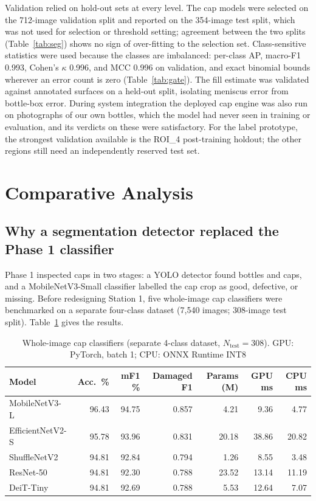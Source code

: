 Validation relied on hold-out sets at every level. The cap models were selected on the 712-image validation split and reported on the 354-image test split, which was not used for selection or threshold setting; agreement between the two splits (Table~\ref{tab:seg}) shows no sign of over-fitting to the selection set. Class-sensitive statistics were used because the classes are imbalanced: per-class AP, macro-F1 0.993, Cohen's $\kappa$ 0.996, and MCC 0.996 on validation, and exact binomial bounds wherever an error count is zero (Table~\ref{tab:gate}). The fill estimate was validated against annotated surfaces on a held-out split, isolating meniscus error from bottle-box error. During system integration the deployed cap engine was also run on photographs of our own bottles, which the model had never seen in training or evaluation, and its verdicts on these were satisfactory. For the label prototype, the strongest validation available is the ROI\_4 post-training holdout; the other regions still need an independently reserved test set.

\section{Comparative Analysis}
\label{sec:comparative-analysis}

\subsection{Why a segmentation detector replaced the Phase 1 classifier}
\label{sec:why-seg}
Phase 1 inspected caps in two stages: a YOLO detector found bottles and caps, and a MobileNetV3-Small classifier labelled the cap crop as good, defective, or missing. Before redesigning Station 1, five whole-image cap classifiers were benchmarked on a separate four-class dataset (7,540 images; 308-image test split). Table~\ref{tab:classifiers} gives the results.

\begin{table}[htbp]
\centering
\caption{Whole-image cap classifiers (separate 4-class dataset, $N_{\text{test}}=308$). GPU: PyTorch, batch 1; CPU: ONNX Runtime INT8}
\label{tab:classifiers}
\footnotesize
\begin{tabular}{|l|r|r|r|r|r|r|}
\hline
\textbf{Model} & \textbf{Acc.\ \%} & \textbf{mF1 \%} & \textbf{Damaged F1} & \textbf{Params (M)} & \textbf{GPU ms} & \textbf{CPU ms} \\ \hline
MobileNetV3-L~\cite{howard2019} & 96.43 & 94.75 & 0.857 & 4.21 & 9.36 & 4.77 \\ \hline
EfficientNetV2-S~\cite{tan2021} & 95.78 & 93.96 & 0.831 & 20.18 & 38.86 & 20.82 \\ \hline
ShuffleNetV2~\cite{ma2018} & 94.81 & 92.84 & 0.794 & 1.26 & 8.55 & 3.48 \\ \hline
ResNet-50~\cite{he2016} & 94.81 & 92.30 & 0.788 & 23.52 & 13.14 & 11.19 \\ \hline
DeiT-Tiny~\cite{touvron2021} & 94.81 & 92.69 & 0.788 & 5.53 & 12.64 & 7.07 \\ \hline
\end{tabular}
\end{table}

